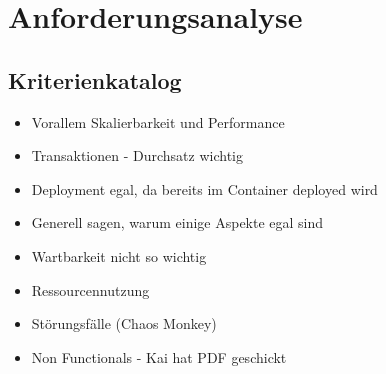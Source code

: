 \chapter{Anforderungsanalyse}

\section{Kriterienkatalog}
\begin{itemize}
  \item Vorallem Skalierbarkeit und Performance
  \item Transaktionen - Durchsatz wichtig
  \item Deployment egal, da bereits im Container deployed wird
  \item Generell sagen, warum einige Aspekte egal sind
  \item Wartbarkeit nicht so wichtig
  \item Ressourcennutzung
  \item St\"orungsf\"alle (Chaos Monkey)
  \item Non Functionals - Kai hat PDF geschickt
\end{itemize}

